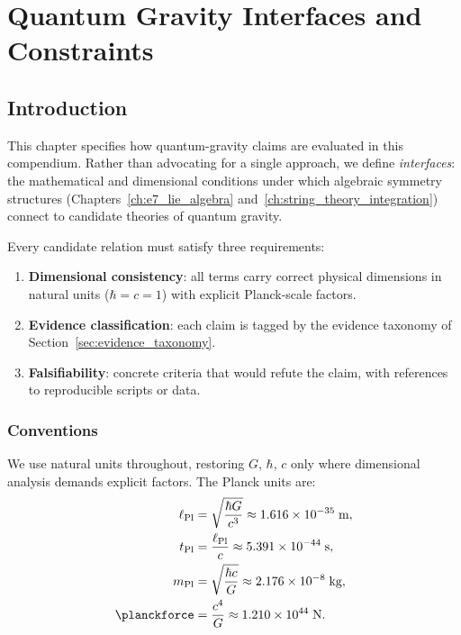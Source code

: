 
\chapter{Quantum Gravity Interfaces and Constraints}
\label{ch:quantum_gravity_interfaces}

\section{Introduction}

This chapter specifies how quantum-gravity claims are evaluated in this
compendium.  Rather than advocating for a single approach, we define
\emph{interfaces}: the mathematical and dimensional conditions under which
algebraic symmetry structures (Chapters~\ref{ch:e7_lie_algebra}
and~\ref{ch:string_theory_integration}) connect to candidate theories of
quantum gravity.

Every candidate relation must satisfy three requirements:
\begin{enumerate}
    \item \textbf{Dimensional consistency}: all terms carry correct physical
          dimensions in natural units ($\hbar = c = 1$) with explicit
          Planck-scale factors.
    \item \textbf{Evidence classification}: each claim is tagged by the
          evidence taxonomy of Section~\ref{sec:evidence_taxonomy}.
    \item \textbf{Falsifiability}: concrete criteria that would refute the
          claim, with references to reproducible scripts or data.
\end{enumerate}

\subsection{Conventions}

We use natural units throughout, restoring $G$, $\hbar$, $c$ only where
dimensional analysis demands explicit factors.  The Planck units are:
\begin{align}
\label{eq:planck_units}
\ell_{\mathrm{Pl}} &= \sqrt{\frac{\hbar G}{c^3}}
    \approx 1.616 \times 10^{-35}\;\text{m}, \\
t_{\mathrm{Pl}} &= \frac{\ell_{\mathrm{Pl}}}{c}
    \approx 5.391 \times 10^{-44}\;\text{s}, \\
m_{\mathrm{Pl}} &= \sqrt{\frac{\hbar c}{G}}
    \approx 2.176 \times 10^{-8}\;\text{kg}, \\
\planckforce &= \frac{c^4}{G}
    \approx 1.210 \times 10^{44}\;\text{N}.
\end{align}

